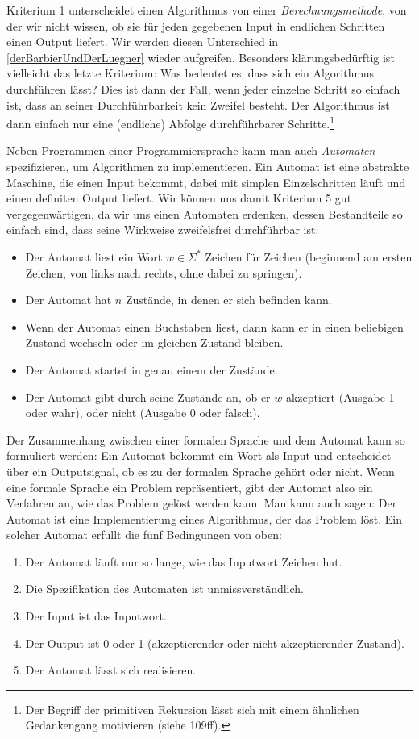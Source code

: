 Kriterium 1 unterscheidet einen Algorithmus von einer \emph{Berechnungsmethode},
von der wir nicht wissen,
ob sie für jeden gegebenen Input in endlichen Schritten einen Output liefert.
Wir werden diesen Unterschied in \autoref{derBarbierUndDerLuegner} wieder aufgreifen.
Besonders klärungsbedürftig ist vielleicht das letzte Kriterium:
Was bedeutet es, dass sich ein Algorithmus durchführen lässt?
Dies ist dann der Fall, wenn jeder einzelne Schritt so einfach ist,
dass an seiner Durchführbarkeit kein Zweifel besteht.
Der Algorithmus ist dann einfach nur eine (endliche)
Abfolge durchführbarer Schritte.\footnote{Der Begriff der primitiven Rekursion
lässt sich mit einem ähnlichen Gedankengang motivieren (siehe \cite{schoening} 109ff).}

Neben Programmen einer Programmiersprache kann man auch
\emph{Automaten} spezifizieren,
um Algorithmen zu implementieren.
Ein Automat ist eine abstrakte Maschine,
die einen Input bekommt, 
dabei mit simplen Einzelschritten läuft
und einen definiten Output liefert.
Wir können uns damit Kriterium 5 gut vergegenwärtigen,
da wir uns einen Automaten erdenken,
dessen Bestandteile so einfach sind,
dass seine Wirkweise zweifelsfrei durchführbar ist:

\begin{itemize}
    \item Der Automat liest ein Wort $w \in \Sigma^*$ Zeichen für Zeichen
        (beginnend am ersten Zeichen, von links nach rechts, ohne dabei zu springen).
    \item Der Automat hat $n$ Zustände, in denen er sich befinden kann.
    \item Wenn der Automat einen Buchstaben liest,
        dann kann er in einen beliebigen Zustand wechseln oder im gleichen Zustand bleiben.
    \item Der Automat startet in genau einem der Zustände.
    \item Der Automat gibt durch seine Zustände an,
        ob er $w$ akzeptiert (Ausgabe 1 oder wahr),
        oder nicht (Ausgabe 0 oder falsch).
\end{itemize}

Der Zusammenhang zwischen einer formalen Sprache und dem Automat kann so formuliert werden:
Ein Automat bekommt ein Wort als Input und entscheidet über ein Outputsignal,
ob es zu der formalen Sprache gehört oder nicht.
Wenn eine formale Sprache ein Problem repräsentiert,
gibt der Automat also ein Verfahren an, 
wie das Problem gelöst werden kann.
Man kann auch sagen:
Der Automat ist eine Implementierung eines Algorithmus,
der das Problem löst.
Ein solcher Automat erfüllt die fünf Bedingungen von oben:
\begin{enumerate}
    \item Der Automat läuft nur so lange, wie das Inputwort Zeichen hat.
    \item Die Spezifikation des Automaten ist unmissverständlich.  
    \item Der Input ist das Inputwort.
    \item Der Output ist 0 oder 1 (akzeptierender oder nicht-akzeptierender Zustand).
    \item Der Automat lässt sich realisieren. 
\end{enumerate}

